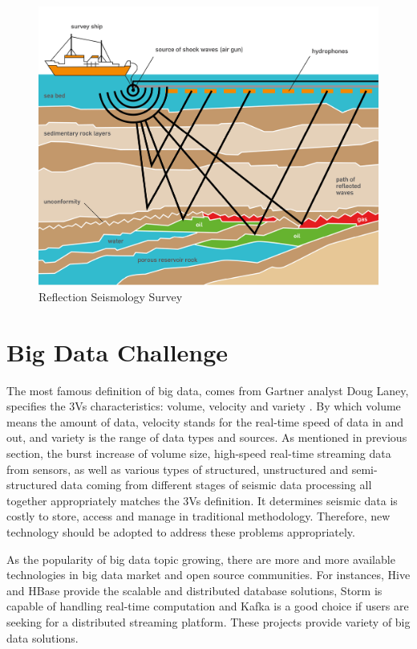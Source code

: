 \begin{figure}[h]
\centering
\includegraphics[scale=1.0]{figures/Seissurvey.jpg}
\caption{Reflection Seismology Survey \cite{seisaov}}
\label{seismic_reflection}
\end{figure}

\section{Big Data Challenge}

The most famous definition of big data, comes from Gartner analyst Doug Laney, specifies the 3Vs characteristics: volume, velocity and variety \cite{demauro2016}. By which volume means the amount of data, velocity stands for the real-time speed of data in and out, and variety is the range of data types and sources. As mentioned in previous section,  the burst increase of volume size, high-speed real-time streaming data from sensors, as well as various types of structured, unstructured and semi-structured data coming from different stages of seismic data processing all together appropriately matches the 3Vs definition. It determines seismic data is costly to store, access and manage in traditional methodology. Therefore, new technology should be adopted to address these problems appropriately.

As the popularity of big data topic growing, there are more and more available technologies in big data market and open source communities. For instances,  Hive and HBase provide the scalable and distributed database solutions, Storm is capable of handling real-time computation and Kafka is a good choice if users are seeking for a distributed streaming platform. These projects provide variety of big data solutions. 

